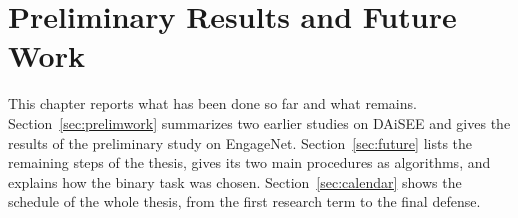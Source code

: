 %
%
%

\chapter{Preliminary Results and Future Work}
\label{sec:prelimfuture}

This chapter reports what has been done so far and what remains. Section~\ref{sec:prelimwork} summarizes two earlier studies on DAiSEE and gives the results of the preliminary study on EngageNet. Section~\ref{sec:future} lists the remaining steps of the thesis, gives its two main procedures as algorithms, and explains how the binary task was chosen. Section~\ref{sec:calendar} shows the schedule of the whole thesis, from the first research term to the final defense.



